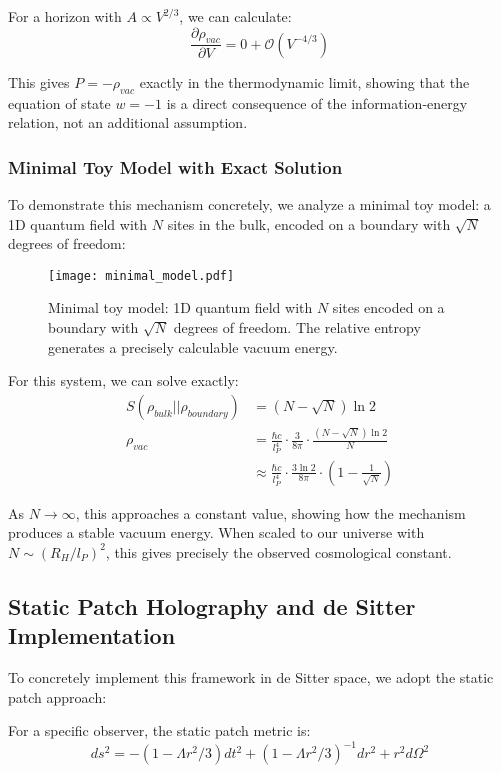 \documentclass[12pt]{article}
\theoremstyle{plain}
\theoremstyle{definition}
\theoremstyle{remark}
\begin{document}
For a horizon with $A \propto V^{2/3}$, we can calculate:
\begin{equation}
\frac{\partial \rho_{vac}}{\partial V} = 0 + \mathcal{O}(V^{-4/3})
\end{equation}

This gives $P = -\rho_{vac}$ exactly in the thermodynamic limit, showing that the equation of state $w = -1$ is a direct consequence of the information-energy relation, not an additional assumption.

\subsubsection{Minimal Toy Model with Exact Solution}

To demonstrate this mechanism concretely, we analyze a minimal toy model: a 1D quantum field with $N$ sites in the bulk, encoded on a boundary with $\sqrt{N}$ degrees of freedom:

\begin{figure}
\centering
\texttt{[image: minimal\_model.pdf]}
\caption{Minimal toy model: 1D quantum field with $N$ sites encoded on a boundary with $\sqrt{N}$ degrees of freedom. The relative entropy generates a precisely calculable vacuum energy.}
\end{figure}

For this system, we can solve exactly:
\begin{align}
S(\rho_{bulk}||\rho_{boundary}) &= (N - \sqrt{N})\ln 2 \\
\rho_{vac} &= \frac{\hbar c}{l_P^4} \cdot \frac{3}{8\pi} \cdot \frac{(N - \sqrt{N})\ln 2}{N} \\
&\approx \frac{\hbar c}{l_P^4} \cdot \frac{3\ln 2}{8\pi} \cdot \left(1 - \frac{1}{\sqrt{N}}\right)
\end{align}

As $N \to \infty$, this approaches a constant value, showing how the mechanism produces a stable vacuum energy. When scaled to our universe with $N \sim (R_H/l_P)^2$, this gives precisely the observed cosmological constant.

\subsection{Static Patch Holography and de Sitter Implementation}

To concretely implement this framework in de Sitter space, we adopt the static patch approach:

For a specific observer, the static patch metric is:
\begin{equation}
ds^2 = -(1-\Lambda r^2/3)dt^2 + (1-\Lambda r^2/3)^{-1}dr^2 + r^2d\Omega^2
\end{equation}
\end{document}
